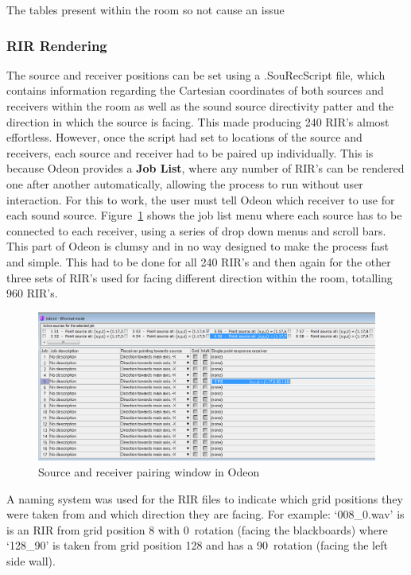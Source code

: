 \documentclass[../../main.tex]{subfiles}
\begin{document}
			The tables present within the room so not cause an issue 

		\subsubsection{RIR Rendering}
			\label{odeon:rendering}

			The source and receiver positions can be set using a .SouRecScript file, which contains information regarding the Cartesian coordinates of both sources and receivers within the room as well as the sound source directivity patter and the direction in which the source is facing. This made producing 240 \ac{RIR}'s almost effortless. However, once the script had set to locations of the source and receivers, each source and receiver had to be paired up individually. This is because Odeon provides a \textbf{Job List}, where any number of \ac{RIR}'s can be rendered one after another automatically, allowing the process to run without user interaction. For this to work, the user must tell Odeon which receiver to use for each sound source. Figure~\ref{SouRecPos} shows the job list menu where each source has to be connected to each receiver, using a series of drop down menus and scroll bars. This part of Odeon is clumsy and in no way designed to make the process fast and simple. This had to be done for all 240 \ac{RIR}'s and then again for the other three sets of \ac{RIR}'s used for facing different direction within the room, totalling 960 \ac{RIR}'s.

			\begin{figure}[H]
				\centerline{\includegraphics[scale = 0.4]{Sections/Implementation/Odeon/images/SouRecPos/SouRecSelection_crop.png}}
				\caption{Source and receiver pairing window in Odeon}
				\label{SouRecPos}
			\end{figure}

			A naming system was used for the \ac{RIR} files to indicate which grid positions they were taken from and which direction they are facing. For example: `008\_0.wav' is is an \ac{RIR} from grid position 8 with 0\textdegree~rotation (facing the blackboards) where `128\_90' is taken from grid position 128 and has a 90\textdegree~rotation (facing the left side wall).
\end{document}
